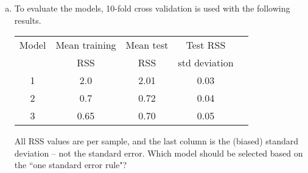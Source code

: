 \documentclass[11pt]{article}
\begin{document}
\begin{enumerate}
\begin{enumerate}[(a)]
  \item To evaluate the models, 10-fold cross validation is used with the following results.
\begin{center}
\begin{tabular}[h]{|c|c|c|c|c|} \hline
Model & Mean training  & Mean test      & Test RSS \\
      & RSS            & RSS            & std deviation \\ \hline
1 & 2.0  & 2.01 & 0.03 \\ \hline
2 & 0.7  & 0.72 & 0.04 \\ \hline
3 & 0.65 & 0.70 & 0.05 \\ \hline
\end{tabular}
\end{center}
All RSS values are per sample, and the last column is the (biased)
standard deviation -- not the standard error.
Which model should be selected based on the ``one standard error rule"?

\end{enumerate}



\end{enumerate}
\end{document}
